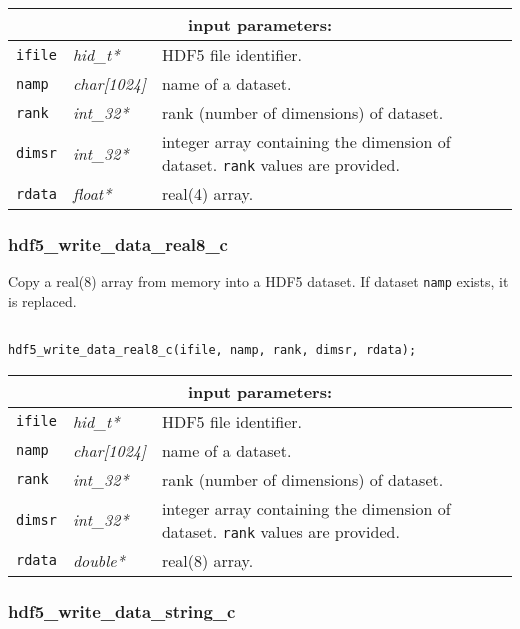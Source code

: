 \noindent
\begin{tabular}{|p{1.5cm}|p{2cm}|p{11cm}|}
\hline
\multicolumn{3}{|c|}{\bf input parameters:} \\
\hline
{\tt ifile} & {\it hid\_t*} & HDF5 file identifier. \\
\hline
{\tt namp} & {\it char[1024]} & name of a dataset. \\
\hline
{\tt rank} & {\it int\_32*} & rank (number of dimensions) of dataset. \\
\hline
{\tt dimsr} & {\it int\_32*} & integer array containing the dimension of dataset. {\tt rank} values are provided. \\
\hline
{\tt rdata} & {\it float*} & real(4) array. \\
\hline
\end{tabular}

\subsubsection{hdf5\_write\_data\_real8\_c}

Copy a real(8) array from memory into a HDF5 dataset. If dataset {\tt namp} exists, it is replaced.

\begin{verbatim}

hdf5_write_data_real8_c(ifile, namp, rank, dimsr, rdata);
\end{verbatim}

\noindent
\begin{tabular}{|p{1.5cm}|p{2cm}|p{11cm}|}
\hline
\multicolumn{3}{|c|}{\bf input parameters:} \\
\hline
{\tt ifile} & {\it hid\_t*} & HDF5 file identifier. \\
\hline
{\tt namp} & {\it char[1024]} & name of a dataset. \\
\hline
{\tt rank} & {\it int\_32*} & rank (number of dimensions) of dataset. \\
\hline
{\tt dimsr} & {\it int\_32*} & integer array containing the dimension of dataset. {\tt rank} values are provided. \\
\hline
{\tt rdata} & {\it double*} & real(8) array. \\
\hline
\end{tabular}

\subsubsection{hdf5\_write\_data\_string\_c}

